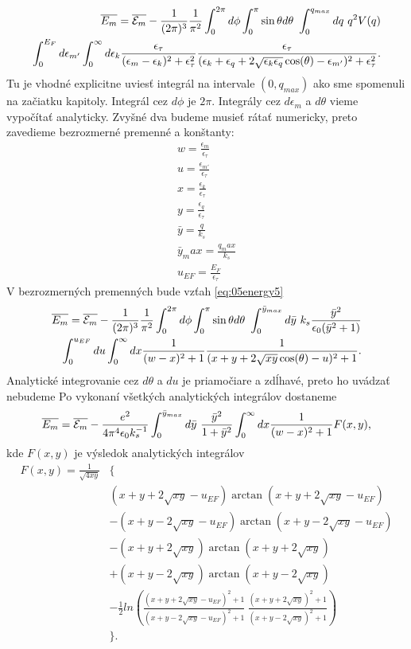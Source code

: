 \begin{align}
\label{eq:05energy5}
\notag
\overline{E_m}=\overline{\mathcal{E}_m} - \frac{1}{(2\pi)^3}\frac{1}{\pi^2}\int_0^{2\pi}d\phi \int_0^\pi \sin\theta d\theta\  \int_0^{q_{max}} dq\ q^2 V(q)\\ 
\int_0^{E_F} d\epsilon_{m'} \int_0^{\infty} d \epsilon_k  \frac{\epsilon_\tau}{(\epsilon_m-\epsilon_k)^2+\epsilon_\tau^2}\frac{\epsilon_\tau}{(\epsilon_{k}+\epsilon_{q}+2\sqrt{\epsilon_{k}\epsilon_{q}}\cos(\theta)-\epsilon_{m'})^2+\epsilon_\tau^2} \text{.} 
\end{align}
Tu je vhodné explicitne uviesť integrál na intervale $(0,q_{max})$ ako sme spomenuli na začiatku kapitoly.
Integrál cez $d\phi$ je $2\pi$. Integrály cez $d\epsilon_m$ a $d\theta$ vieme vypočítať analyticky. Zvyšné dva budeme musieť rátať numericky, preto zavedieme bezrozmerné premenné a konštanty:
\begin{align*}
w=\frac{\epsilon_m}{\epsilon_\tau} \\
u=\frac{\epsilon_{m'}}{\epsilon_\tau} \\
x=\frac{\epsilon_k}{\epsilon_\tau} \\
y=\frac{\epsilon_q}{\epsilon_\tau}\\ 
\bar{y}=\frac{q}{k_s}\\
\bar{y}_max=\frac{q_max}{k_s}\\
u_{EF}=\frac{E_F}{\epsilon_\tau}
\end{align*}
V bezrozmerných premenných bude vzťah \eqref{eq:05energy5} 
\begin{align}
\notag
\overline{E_m}=\overline{\mathcal{E}_m} - \frac{1}{(2\pi)^3}\frac{1}{\pi^2}\int_0^{2\pi}d\phi \int_0^\pi \sin\theta d\theta\  \int_0^{\bar{y}_{max}} d\bar{y}\ k_s \frac{\bar{y}^2}{\epsilon_0(\bar{y}^2+1)}\\ 
\int_0^{u_{EF}} du \int_0^{\infty} dx  \frac{1}{(w-x)^2+1}\frac{1}{(x+y+2\sqrt{xy}\cos(\theta)-u)^2+1} \text{.} 
\end{align}
Analytické integrovanie cez $d\theta$ a $du$ je priamočiare a zdĺhavé, preto ho uvádzať nebudeme Po vykonaní všetkých analytických integrálov dostaneme
\begin{align}
\label{eq:05energy6}
\overline{E_m}=\overline{\E_m}-\frac{e^2}{4\pi^4\epsilon_0 k_s^{-1}} \int_0^{\bar y_{max}} d\bar{y}\ \frac{\bar{y}^2}{1+\bar{y}^2}\int_0^{\infty} dx \frac{1}{(w-x)^2+1}F(x,y) \text{,}
\end{align}
kde  $F(x,y)$ je výsledok analytických integrálov
\begin{align*}
F(x,y)=\frac{1}{\sqrt{4xy}}&\{ \\
&(x+y+2\sqrt{xy}-u_{EF})\arctan(x+y+2\sqrt{xy}-u_{EF}) \\
&-(x+y-2\sqrt{xy}-u_{EF})\arctan(x+y-2\sqrt{xy}-u_{EF}) \\
&-(x+y+2\sqrt{xy})\arctan(x+y+2\sqrt{xy}) \\
&+(x+y-2\sqrt{xy})\arctan(x+y-2\sqrt{xy}) \\
&-\frac{1}{2}ln(\frac{(x+y+2\sqrt{xy}-u_{EF})^2+1}{(x+y-2\sqrt{xy}-u_{EF})^2+1}\ \frac{(x+y+2\sqrt{xy})^2+1}{(x+y-2\sqrt{xy})^2+1})\\
&\}\text{.}
\end{align*}


